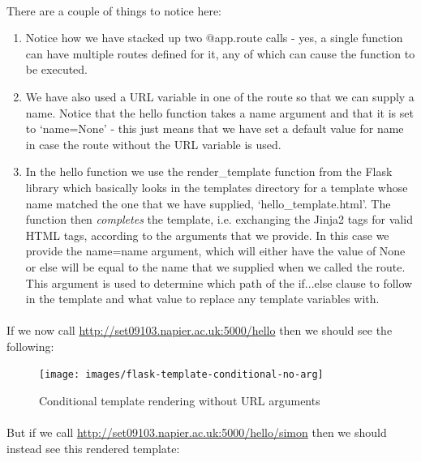 \documentclass[12pt, a4paper, oneside]{book}
\begin{document}
{\paragraph{} There are a couple of things to notice here:
\begin{enumerate}
\item Notice how we have stacked up two @app.route calls - yes, a single function can have multiple routes defined for it, any of which can cause the function to be executed.
\item We have also used a URL variable in one of the route so that we can supply a name. Notice that the hello function takes a name argument and that it is set to `name=None' - this just means that we have set a default value for name in case the route without the URL variable is used.
\item In the hello function we use the render\_template function from the Flask library which basically looks in the templates directory for a template whose name matched the one that we have supplied, `hello\_template.html'. The function then \emph{completes} the template, i.e. exchanging the Jinja2 tags for valid HTML tags, according to the arguments that we provide. In this case we provide the name=name argument, which will either have the value of None or else will be equal to the name that we supplied when we called the route. This argument is used to determine which path of the if...else clause to follow in the template and what value to replace any template variables with.
\end{enumerate}

\paragraph{} If we now call \url{http://set09103.napier.ac.uk:5000/hello} then we should see the following:

\begin{figure}[H]
\centering
\texttt{[image: images/flask-template-conditional-no-arg]}
\caption{Conditional template rendering without URL arguments}
\label{fig:flask-template-conditional-no-arg}
\end{figure}

\paragraph{} But if we call \url{http://set09103.napier.ac.uk:5000/hello/simon} then we should instead see this rendered template:

}
\end{document}

